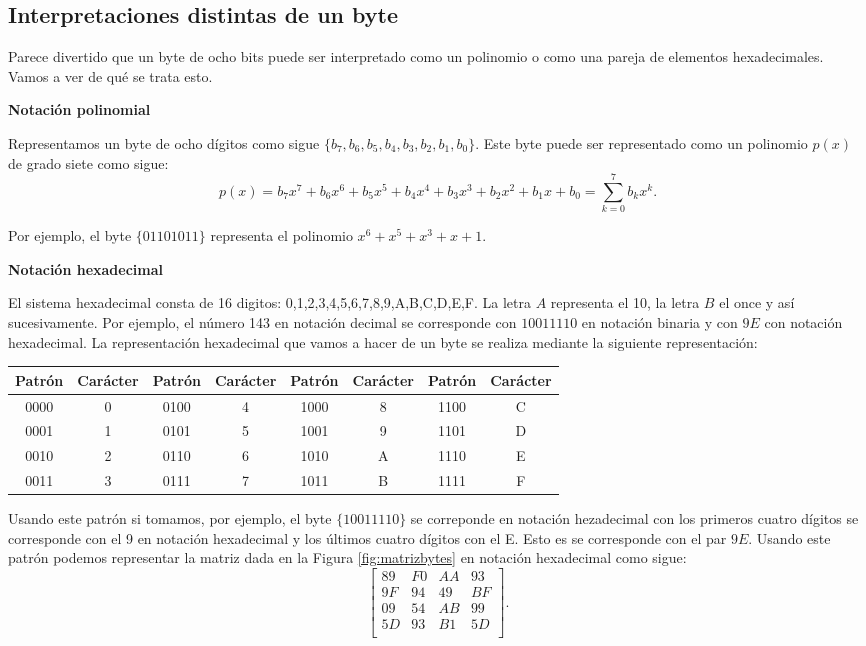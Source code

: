 \subsection{Interpretaciones distintas de un byte}

Parece divertido que un byte de ocho bits puede ser interpretado como un polinomio o como una pareja de elementos hexadecimales. Vamos a ver de qué se trata esto.

\begin{center}
\textbf{Notación polinomial}
\end{center}

Representamos un byte de ocho dígitos como sigue $\{b_7, b_6,b_5,b_4,b_3,b_2,b_1,b_0\}$. Este byte puede ser representado como un polinomio $p(x)$ de grado siete como sigue:
\begin{equation}\label{eq:pol}
p(x)=b_7 x^7 +b_6 x^6+b_5 x^5+b_4 x^4+b_3 x^3+b_2 x^2+b_1 x+b_0=\sum_{k=0}^7 b_k x^k.
\end{equation}

Por ejemplo, el byte $\{01101011\}$ representa el polinomio $x^6+x^5+x^3+x+1$.

\begin{center}
\textbf{Notación hexadecimal}
\end{center}

El sistema hexadecimal consta de 16 digitos: 0,1,2,3,4,5,6,7,8,9,A,B,C,D,E,F. La letra $A$ representa el 10, la letra $B$ el once y así sucesivamente. Por ejemplo, el número 143 en notación decimal se corresponde con $10011110$ en notación binaria y con $9E$ con notación hexadecimal. La representación hexadecimal que vamos a hacer de un byte se realiza mediante la siguiente representación:
\begin{center}
\begin{tabular}{|c|c||c|c||c|c||c|c|}\hline
Patrón & Carácter & Patrón & Carácter & Patrón & Carácter & Patrón & Carácter\\\hline
0000 & 0 & 0100 & 4 & 1000 & 8 & 1100 & C\\
0001 & 1 & 0101 & 5 & 1001 & 9 & 1101 & D\\
0010 & 2 & 0110 & 6 & 1010 & A & 1110 & E\\
0011 & 3 & 0111 & 7 & 1011 & B & 1111 & F\\\hline
\end{tabular}
\end{center}
Usando este patrón si tomamos, por ejemplo,  el byte $\{10011110\}$ se correponde en notación hezadecimal con los primeros cuatro dígitos se corresponde con el 9 en notación hexadecimal y los últimos cuatro dígitos con el E. Esto es se corresponde con el par $9E$. Usando este patrón podemos representar la matriz dada en la Figura \ref{fig:matrizbytes} en notación hexadecimal como sigue:
$$\left[
\begin{array}{c|c|c|c}
89 & F0 & AA & 93\\\hline
9F & 94 & 49 & BF\\\hline
09 & 54 & AB & 99\\\hline
5D & 93 & B1 & 5D\\
\end{array}
\right].$$


